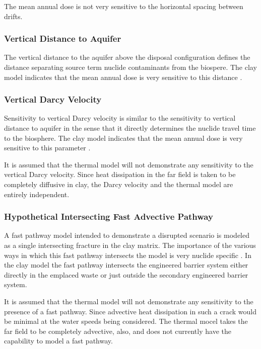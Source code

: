 The mean annual dose is not very sensitive to the horizontal spacing between 
drifts. 

\subsubsection{Vertical Distance to Aquifer}

The vertical distance to the aquifer above the disposal configuration defines 
the distance separating source term nuclide contaminants from the biospere. The 
clay model indicates that the mean annual dose is very sensitive to this 
distance \cite{clayton_generic_2011}.

\subsubsection{Vertical Darcy Velocity}

Sensitivity to vertical Darcy velocity is similar to the sensitivity to vertical 
distance to aquifer in the sense that it directly determines the nuclide travel 
time to the biosphere. The clay model indicates that the mean annual dose is 
very sensitive to this parameter \cite{clayton_generic_2011}.

It is assumed that the thermal model will not demonstrate any
sensitivity to the vertical Darcy velocity. Since heat dissipation in the far 
field is taken to be completely diffusive in clay, the Darcy velocity and the 
thermal model are entirely independent.

\subsubsection{Hypothetical Intersecting Fast Advective Pathway}

A fast pathway model intended to demonstrate a disrupted scenario is modeled as 
a single intersecting fracture in the clay matrix. The importance of the various 
ways in which this fast pathway intersects the model is very nuclide specific 
\cite{clayton_generic_2011}. In the clay model the fast pathway intersects the 
engineered barrier system either directly in the emplaced waste or just outside 
the secondary engineered barrier system.

It is assumed that the thermal model will not demonstrate any
sensitivity to the presence of a fast pathway. Since advective heat dissipation 
in such a crack would be minimal at the water speeds being considered. The 
thermal mocel takes the far field to be completely advective, also, and does not 
currently have the capability to model a fast pathway.

